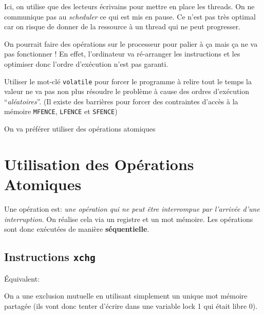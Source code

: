 Ici, on utilise que des lecteurs écrivains pour mettre en place les
threads. On ne communique pas au \emph{scheduler} ce qui est mis en
pause. Ce n'est pas très optimal car on risque de donner de la ressource
à un thread qui ne peut progresser.

On pourrait faire des opérations sur le processeur pour palier à ça mais
ça ne va pas fonctionner ! En effet, l'ordinateur va ré-arranger les
instructions et les optimiser donc l'ordre d'exécution n'est pas
garanti.

Utiliser le mot-clé \texttt{volatile} pour forcer le programme à relire
tout le temps la valeur ne va pas non plus résoudre le problème à cause
des ordres d'exécution ``\emph{aléatoires}''. (Il existe des barrières
pour forcer des contraintes d'accès à la mémoire \texttt{MFENCE},
\texttt{LFENCE} et \texttt{SFENCE})

On va préférer utiliser des opérations atomiques

\section{Utilisation des Opérations
Atomiques}\label{utilisation-des-opuxe9rations-atomiques}

Une opération est: \emph{une opération qui ne peut être interrompue par
l'arrivée d'une interruption}. On réalise cela via un registre et un mot
mémoire. Les opérations sont donc exécutées de manière
\textbf{séquentielle}.

\subsection{\texorpdfstring{Instructions
\texttt{xchg}}{Instructions xchg}}\label{instructions-xchg}

\begin{Shaded}
\begin{Highlighting}[]
\end{Highlighting}
\end{Shaded}

Équivalent:

\begin{Shaded}
\begin{Highlighting}[]
\end{Highlighting}
\end{Shaded}

On a une exclusion mutuelle en utilisant simplement un unique mot
mémoire partagée (ils vont donc tenter d'écrire dans une variable lock 1
qui était libre 0).

